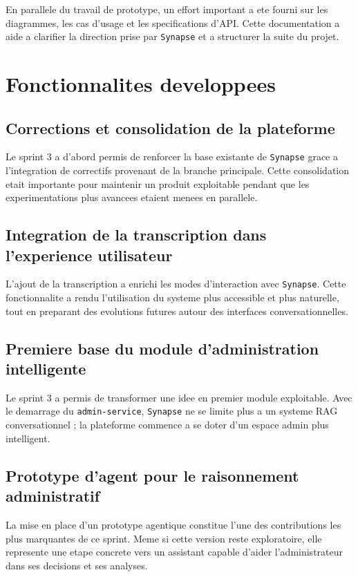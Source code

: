 En parallele du travail de prototype, un effort important a ete fourni sur les diagrammes, les cas d'usage et les specifications d'API. Cette documentation a aide a clarifier la direction prise par \texttt{Synapse} et a structurer la suite du projet.

\section{Fonctionnalites developpees}

\subsection{Corrections et consolidation de la plateforme}

Le sprint 3 a d'abord permis de renforcer la base existante de \texttt{Synapse} grace a l'integration de correctifs provenant de la branche principale. Cette consolidation etait importante pour maintenir un produit exploitable pendant que les experimentations plus avancees etaient menees en parallele.

\subsection{Integration de la transcription dans l'experience utilisateur}

L'ajout de la transcription a enrichi les modes d'interaction avec \texttt{Synapse}. Cette fonctionnalite a rendu l'utilisation du systeme plus accessible et plus naturelle, tout en preparant des evolutions futures autour des interfaces conversationnelles.

\subsection{Premiere base du module d'administration intelligente}

Le sprint 3 a permis de transformer une idee en premier module exploitable. Avec le demarrage du \texttt{admin-service}, \texttt{Synapse} ne se limite plus a un systeme RAG conversationnel ; la plateforme commence a se doter d'un espace admin plus intelligent.

\subsection{Prototype d'agent pour le raisonnement administratif}

La mise en place d'un prototype agentique constitue l'une des contributions les plus marquantes de ce sprint. Meme si cette version reste exploratoire, elle represente une etape concrete vers un assistant capable d'aider l'administrateur dans ses decisions et ses analyses.

